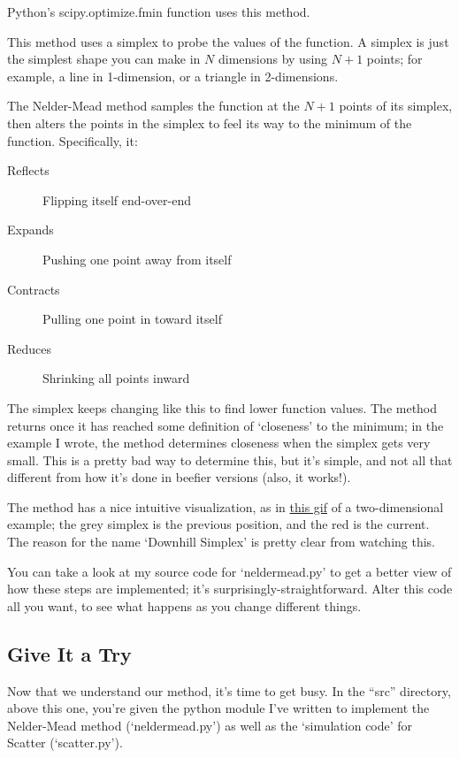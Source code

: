 \documentclass{article}
\begin{document}
		Python's scipy.optimize.fmin function uses this method.

    This method uses a simplex to probe the values of the function.
    A simplex is just the simplest shape you can make in $N$
    dimensions by using $N+1$ points; for example, a line in
    1-dimension, or a triangle in 2-dimensions. 

    The Nelder-Mead method samples the function at the $N+1$ points
    of its simplex, then alters the points in the simplex to
    feel its way to the minimum of the function. Specifically, it:
    \begin{description}
      \item[Reflects] Flipping itself end-over-end
      \item[Expands] Pushing one point away from itself
      \item[Contracts] Pulling one point in toward itself
      \item[Reduces] Shrinking all points inward
    \end{description}

    The simplex keeps changing like this to find lower
    function values. The method returns once it has reached
    some definition of `closeness' to the minimum; in the example
    I wrote, the method determines closeness when the simplex
    gets very small. This is a pretty bad way to determine this,
    but it's simple, and not all that different from how it's
    done in beefier versions (also, it works!).

		The method has a nice intuitive visualization, as in 
		\href{http://userpages.umbc.edu/~rostamia/nelder-mead.html}{this gif}
		of a two-dimensional example; the grey simplex is the previous 
    position, and the red is the current. The reason for the name
		`Downhill Simplex' is pretty clear from watching this.

    You can take a look at my source code for `neldermead.py' to
    get a better view of how these steps are implemented; it's 
    surprisingly-straightforward. Alter this code all you 
    want, to see what happens as you change different things.

	\subsection*{Give It a Try}
    Now that we understand our method, it's time to get busy.
    In the ``src'' directory, above this one, you're given the python
    module I've written to implement the Nelder-Mead method
    (`neldermead.py') as well as the `simulation code'
    for Scatter (`scatter.py').
    
\end{document}
